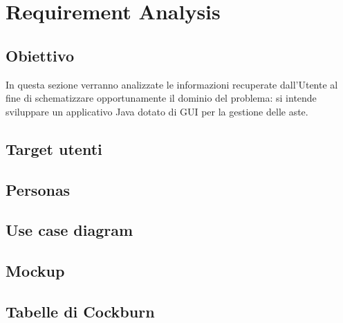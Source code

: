 
\chapter{Requirement Analysis}
    \section{Obiettivo}
        In questa sezione verranno analizzate le informazioni recuperate dall'Utente al fine di schematizzare opportunamente il dominio del problema: si intende sviluppare un applicativo Java dotato di GUI per la gestione delle aste.

   
    
    \section{Target utenti}
    
    \section{Personas}

    \section{Use case diagram}

    \section{Mockup}

    \section{Tabelle di Cockburn}